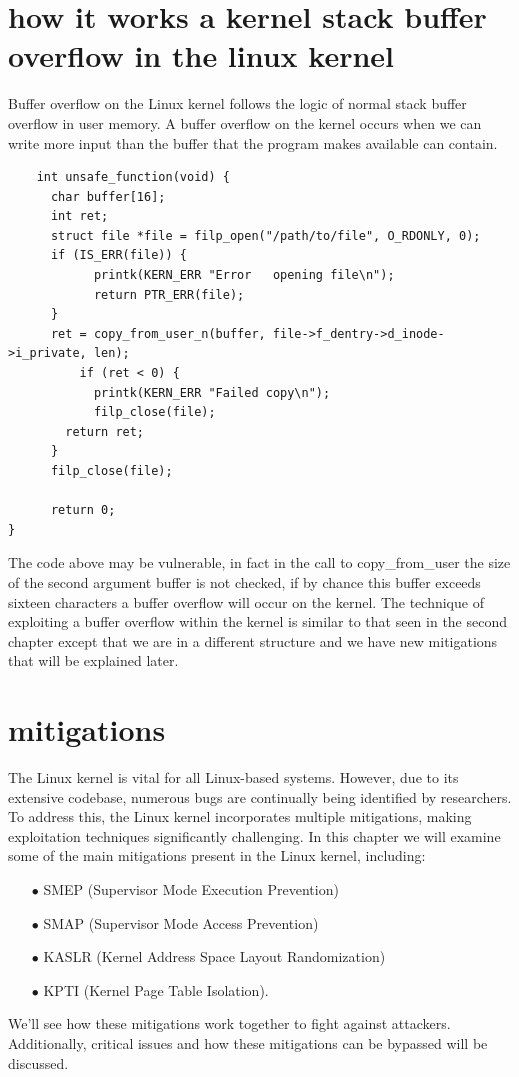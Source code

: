     \section{how it works a kernel stack buffer overflow in the linux kernel}
    Buffer overflow on the Linux kernel follows the logic of normal stack buffer overflow in user memory.
    A buffer overflow on the kernel occurs when we can write more input than the buffer that the program makes available can contain.\newline    
    \begin{verbatim}
    int unsafe_function(void) {
      char buffer[16];
      int ret;
      struct file *file = filp_open("/path/to/file", O_RDONLY, 0);
      if (IS_ERR(file)) {
            printk(KERN_ERR "Error   opening file\n");
            return PTR_ERR(file);
      }
      ret = copy_from_user_n(buffer, file->f_dentry->d_inode->i_private, len);
          if (ret < 0) {
            printk(KERN_ERR "Failed copy\n");
            filp_close(file);
        return ret;
      } 
      filp_close(file);
    
      return 0;
}    
    \end{verbatim}
    The code above may be vulnerable, in fact in the call to copy\_from\_user the size of the second argument buffer is not checked, if by chance this buffer exceeds sixteen characters a buffer overflow will occur on the kernel.\newline
    The technique of exploiting a buffer overflow within the kernel is similar to that seen in the second chapter except that we are in a different structure and we have new mitigations that will be explained later.\newline
    \clearpage
    \section{mitigations}
    The Linux kernel is vital for all Linux-based systems. However, due to its extensive codebase, numerous bugs are continually being identified by researchers. To address this, the Linux kernel incorporates multiple mitigations, making exploitation techniques significantly challenging.\newline
    In this chapter we will examine some of the main mitigations present in the Linux kernel, including:
    \begin{itemize}
        \item[$\bullet$] SMEP (Supervisor Mode Execution Prevention)
        \item[$\bullet$] SMAP (Supervisor Mode Access Prevention) 
        \item[$\bullet$] KASLR (Kernel Address Space Layout Randomization)   
        \item[$\bullet$] KPTI (Kernel Page Table Isolation).\newline 
    \end{itemize}
    We'll see how these mitigations work together to fight against attackers.\newline
    Additionally, critical issues and how these mitigations can be bypassed will be discussed.\newline

